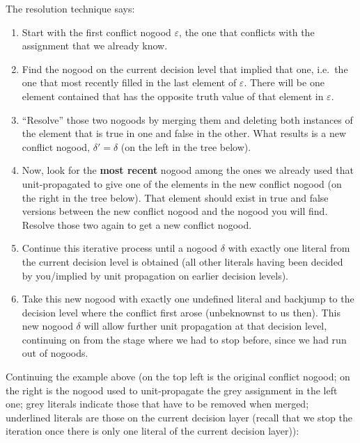 \documentclass[9pt,a4paper,landscape]{article}
\begin{document}
{The resolution technique says:
\begin{enumerate}[noitemsep]
	\item Start with the first conflict nogood $\varepsilon$, the one that conflicts with the assignment that we already know. 
	\item Find the nogood on the current decision level that implied that one, i.e.\ the one that most recently filled in the last element of $\varepsilon$. 
	There will be one element contained that has the opposite truth value of that element in $\varepsilon$.
	\item ``Resolve'' those two nogoods by merging them and deleting both instances of the element that is true in one and false in the other.
	What results is a new conflict nogood, $\delta' = \delta$ (on the left in the tree below).
	\item Now, look for the \textbf{most recent} nogood among the ones we already used that unit-propagated to give one of the elements in the new conflict nogood (on the right in the tree below).
	That element should exist in true and false versions between the new conflict nogood and the nogood you will find.
	Resolve those two again to get a new conflict nogood.
	\item Continue this iterative process until a nogood $\delta$ with exactly one literal from the current decision level is obtained (all other literals having been decided by you/implied by unit propagation on earlier decision levels).
	\item Take this new nogood with exactly one undefined literal and backjump to the decision level where the conflict first arose (unbeknownst to us then).
	This new nogood $\delta$ will allow further unit propagation at that decision level, continuing on from the stage where we had to stop before, since we had run out of nogoods.
\end{enumerate}

Continuing the example above (on the top left is the original conflict nogood; on the right is the nogood used to unit-propagate the grey assignment in the left one; grey literals indicate those that have to be removed when merged; underlined literals are those on the current decision layer (recall that we stop the iteration once there is only one literal of the current decision layer)):

}
\end{document}
